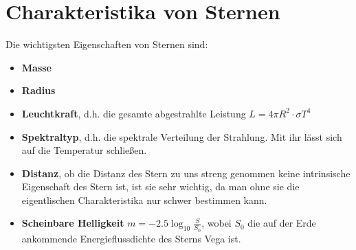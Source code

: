 \documentclass[final]{summery_5.0}
\begin{document}
\section{Charakteristika von Sternen}
Die wichtigsten Eigenschaften von Sternen sind:
\begin{itemize}
    \item {\bf Masse}
    \item {\bf Radius}
    \item {\bf Leuchtkraft}, d.h. die gesamte abgestrahlte Leistung $L = 4\pi R^2 \cdot \sigma T^4$
    \item {\bf Spektraltyp}, d.h. die spektrale Verteilung der Strahlung. Mit ihr lässt sich auf die Temperatur schließen.
    \item {\bf Distanz}, ob die Distanz des Stern zu uns streng genommen keine intrinsische Eigenschaft des Stern ist, ist sie sehr wichtig, da man ohne sie die eigentlischen Charakteristika nur schwer bestimmen kann. 
    \item {\bf Scheinbare Helligkeit} $m = -2.5 \log_{10}\frac{S}{S_0}$, wobei $S_0$ die auf der Erde ankommende Energieflussdichte des Sterns Vega ist.      
\end{itemize}
\end{document}
